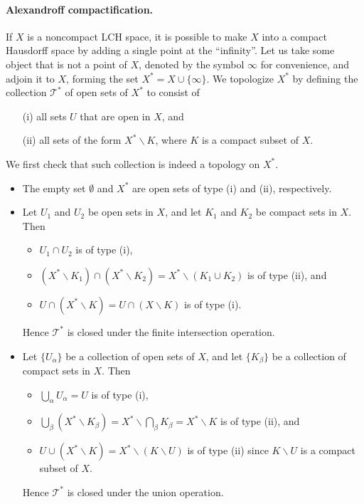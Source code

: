 \documentclass{article}
\numberwithin{equation}{section}
\theoremstyle{plain}
\theoremstyle{definition}
\begin{document}
\paragraph{Alexandroff compactification.} 
If $X$ is a noncompact LCH space, it is possible to make $X$ into a compact Hausdorff space by adding a single point at the ``infinity''. Let us take some object that is not a point of $X$, denoted by the symbol $\infty$ for convenience, and adjoin it to $X$, forming the set $X^*=X\cup\{\infty\}$. We topologize $X^*$ by defining the collection $\mathscr{T}^*$ of open sets of $X^*$ to consist of 
\begin{itemize}
	\item[(i)] all sets $U$ that are open in $X$, and
	\item[(ii)] all sets of the form $X^*\backslash K$, where $K$ is a compact subset of $X$.
\end{itemize}
We first check that such collection is indeed a topology on $X^*$. 
\begin{itemize}
	\item The empty set $\emptyset$ and $X^*$ are open sets of type (i) and (ii), respectively.
	\item Let $U_1$ and $U_2$ be open sets in $X$, and let $K_1$ and $K_2$ be compact sets in $X$. Then \vspace{-0.05cm}
	\begin{itemize}
		\item $U_1\cap U_2$ is of type (i), \vspace{-0.05cm}
		\item $(X^*\backslash K_1)\cap (X^*\backslash K_2) = X^*\backslash(K_1\cup K_2)$ is of type (ii), and \vspace{-0.05cm}
		\item $U\cap (X^*\backslash K) = U\cap (X\backslash K)$ is of type (i).\vspace{-0.05cm}
	\end{itemize}
	Hence $\mathscr{T}^*$ is closed under the finite intersection operation.
	\item Let $\{U_\alpha\}$ be a collection of open sets of $X$, and let $\{K_\beta\}$ be a collection of compact sets in $X$. Then \vspace{-0.05cm}
	\begin{itemize}
		\item $\bigcup_{\alpha}U_\alpha = U$ is of type (i),\vspace{-0.05cm}
		\item $\bigcup_{\beta}(X^*\backslash K_\beta) = X^*\backslash\bigcap_\beta K_\beta = X^*\backslash K$ is of type (ii), and \vspace{-0.05cm}
		\item $U \cup (X^*\backslash K) = X^*\backslash (K\backslash U)$ is of type (ii) since $K\backslash U$ is a compact subset of $X$.\vspace{-0.05cm}
	\end{itemize}
	Hence $\mathscr{T}^*$ is closed under the union operation.
\end{itemize} 
\end{document}
